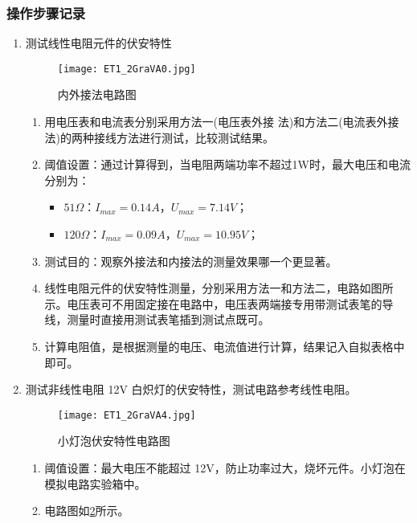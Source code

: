 \documentclass[dvipsnames, svgnames,a4paper,11pt]{article}
\begin{document}
	\subsubsection{操作步骤记录}
	\begin{enumerate}
		
		\item 测试线性电阻元件的伏安特性

			\begin{figure}[htbp]
				\centering
				\texttt{[image: ET1\_2GraVA0.jpg]}
				\caption{内外接法电路图}
				\label{fig:figdata-0}
			\end{figure}

		\begin{enumerate}
			\item 用电压表和电流表分别采用方法一(电压表外接 法)和方法二(电流表外接法)的两种接线方法进行测试，比较测试结果。
			\item 阈值设置：通过计算得到，当电阻两端功率不超过1W时，最大电压和电流分别为：
			\begin{itemize}
				\item $51\Omega$：$I_{max}=0.14A$，$U_{max}=7.14V$；
				\item $120\Omega$：$I_{max}=0.09A$，$U_{max}=10.95V$；
			\end{itemize}
			\item 测试目的：观察外接法和内接法的测量效果哪一个更显著。
			\item 线性电阻元件的伏安特性测量，分别采用方法一和方法二，电路如图所示。电压表可不用固定接在电路中，电压表两端接专用带测试表笔的导线，测量时直接用测试表笔插到测试点既可。
			\item 计算电阻值，是根据测量的电压、电流值进行计算，结果记入自拟表格中即可。
		\end{enumerate}
		
		\item 测试非线性电阻 12V 白炽灯的伏安特性，测试电路参考线性电阻。
		
			\begin{figure}[htbp]
				\centering
				\texttt{[image: ET1\_2GraVA4.jpg]}
				\caption{小灯泡伏安特性电路图}
				\label{fig:figdata-4-1}
			\end{figure}

		\begin{enumerate}
			\item 阈值设置：最大电压不能超过 12V，防止功率过大，烧坏元件。小灯泡在模拟电路实验箱中。
			\item 电路图如\cref{fig:figdata-4-1}所示。
		\end{enumerate}
		

\end{enumerate}
\end{document}

